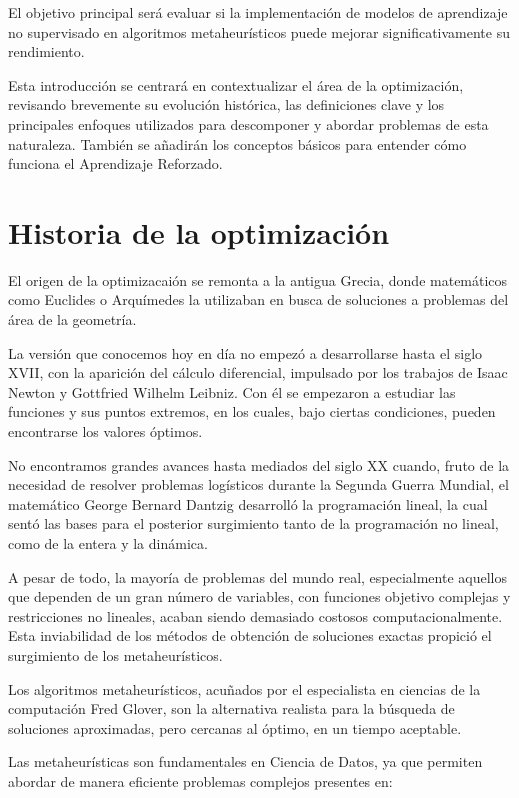 \documentclass[12pt,a4paper]{book}
\begin{document}
El objetivo principal será evaluar si la implementación de modelos de aprendizaje no supervisado en algoritmos metaheurísticos puede mejorar significativamente su rendimiento.

Esta introducción se centrará en contextualizar el área de la optimización, revisando brevemente su evolución histórica, las definiciones clave y los principales enfoques utilizados para descomponer y abordar problemas de esta naturaleza. También se añadirán los conceptos básicos para entender cómo funciona el Aprendizaje Reforzado.


\section{Historia de la optimización}
El origen de la optimizacaión se remonta a la antigua Grecia, donde matemáticos como Euclides o Arquímedes la utilizaban en busca de soluciones a problemas del área de la geometría.

La versión que conocemos hoy en día no empezó a desarrollarse hasta el siglo XVII, con la aparición del cálculo diferencial, impulsado por los trabajos de Isaac Newton y Gottfried Wilhelm Leibniz\cite{Leibniz}. Con él se empezaron a estudiar las funciones y sus puntos extremos,
en los cuales, bajo ciertas condiciones, pueden encontrarse los valores óptimos.

No encontramos grandes avances hasta mediados del siglo XX cuando, fruto de la necesidad de resolver problemas logísticos durante la Segunda Guerra Mundial, el matemático George Bernard Dantzig \cite{Dantzig} desarrolló la programación lineal, la cual sentó las bases para el posterior surgimiento tanto de la programación no lineal, como de la entera y la dinámica.

A pesar de todo, la mayoría de problemas del mundo real, especialmente aquellos que dependen de un gran número de variables, con funciones objetivo complejas y restricciones no lineales, acaban siendo demasiado costosos computacionalmente. Esta inviabilidad de los métodos de obtención de soluciones exactas propició el surgimiento de los metaheurísticos.

Los algoritmos metaheurísticos\cite{metaheuristicos}, acuñados por el especialista en ciencias de la computación Fred Glover,
son la alternativa realista para la búsqueda de soluciones aproximadas, pero cercanas al óptimo, en un tiempo aceptable.

Las metaheurísticas son fundamentales en Ciencia de Datos, ya que permiten abordar de manera eficiente problemas complejos presentes en:
\end{document}
